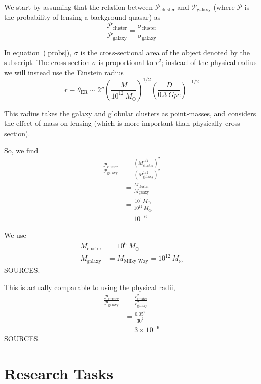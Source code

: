 \documentclass[a4paper]{article} %
\begin{document}
We start by assuming that the relation between $\mathcal{P}_{\text{cluster}}$ and $\mathcal{P}_{\text{galaxy}}$ (where $\mathcal{P}$ is the probability of lensing a background quasar) as
\begin{equation}
\frac{\mathcal{P}_{\text{cluster}}}{\mathcal{P}_{\text{galaxy}}}=\frac{\sigma_{\text{cluster}}}{\sigma_{\text{galaxy}}} \label{probs}
\end{equation}

In equation~(\ref{probs}), $\sigma$ is the cross-sectional area of the object denoted by the subscript. The cross-section $\sigma$ is proportional to $r^2$; instead of the physical radius we will instead use the Einstein radius
\begin{equation}
r \equiv \theta_{\text{ER}} \sim 2''  \left(\frac{M}{10^{12}~M_{\odot}}\right)^{1/2}\left(\frac{D}{\SI{0.3}{Gpc}}\right)^{-1/2}
\end{equation}

This radius takes the galaxy and globular clusters as point-masses, and considers the effect of mass on lensing (which is more important than physically cross-section).

So, we find
\begin{align}
\frac{\mathcal{P}_{\text{cluster}}}{\mathcal{P}_{\text{galaxy}}}
&=\frac{(M_{\text{cluster}}^{1/2})^2}{(M_{\text{galaxy}}^{1/2})^2}\\
&=\frac{M_{\text{cluster}}}{M_{\text{galaxy}}}\\
&=\frac{10^6~M_{\odot}}{10^{12}~M_{\odot}}\\
&=10^{-6}
\end{align}

We use
\begin{align}
M_{\text{cluster}}&=10^6~M_{\odot}\\
M_{\text{galaxy}}&=M_{\text{Milky Way}}=10^{12}~M_{\odot}
\end{align}
SOURCES.

This is actually comparable to using the physical radii,
\begin{align}
\frac{\mathcal{P}_{\text{cluster}}}{\mathcal{P}_{\text{galaxy}}}
&=\frac{r^2_{\text{cluster}}}{r^2_{\text{galaxy}}}\\
&=\frac{0.05^2}{30^2}\\
&=3\times 10^{-6}
\end{align}
SOURCES.



\section{Research Tasks}
\end{document}

